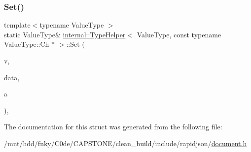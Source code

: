 \subsubsection{\texorpdfstring{Set()}{Set()}\hspace{0.1cm}{\footnotesize\ttfamily [2/2]}}
{\footnotesize\ttfamily template$<$typename Value\+Type $>$ \\
static Value\+Type\& \hyperlink{structinternal_1_1TypeHelper}{internal\+::\+Type\+Helper}$<$ Value\+Type, const typename Value\+Type\+::\+Ch $\ast$ $>$\+::Set (\begin{DoxyParamCaption}\item[{Value\+Type \&}]{v,  }\item[{const \hyperlink{structinternal_1_1TypeHelper_3_01ValueType_00_01const_01typename_01ValueType_1_1Ch_01_5_01_4_a61b7fd9c92eab60394fdff466251c399}{String\+Type}}]{data,  }\item[{typename Value\+Type\+::\+Allocator\+Type \&}]{a }\end{DoxyParamCaption})\hspace{0.3cm}{\ttfamily [inline]}, {\ttfamily [static]}}



The documentation for this struct was generated from the following file\+:\begin{DoxyCompactItemize}
\item 
/mnt/hdd/fnky/\+C0de/\+C\+A\+P\+S\+T\+O\+N\+E/clean\+\_\+build/include/rapidjson/\hyperlink{document_8h}{document.\+h}\end{DoxyCompactItemize}
